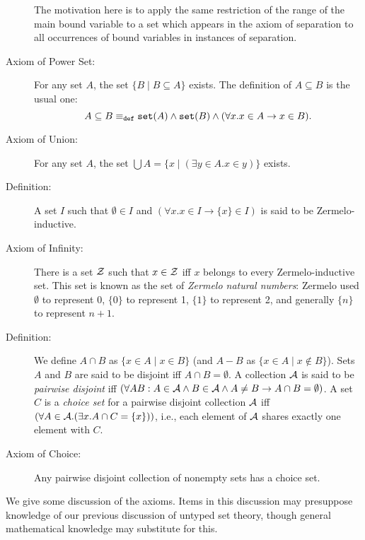 \documentclass[12pt]{book}
\begin{document}
\begin{description}
\begin{description}
\end{description}

The motivation here is to apply the same restriction of the range of the main bound variable to a set which appears in the axiom of separation to all occurrences of bound variables in instances of separation. 

\item[Axiom of Power Set:] For any set $A$, the set $\{B \mid B \subseteq A\}$
exists.  The definition of $A \subseteq B$ is the usual one:  $$A \subseteq B \equiv_{\tt def} {\tt set}(A) \wedge {\tt set}(B) \wedge (\forall x.x \in A \rightarrow x \in B).$$ 

\item[Axiom of Union:] For any set $A$, the set $\bigcup A = \{x \mid (\exists
y \in A.x \in y)\}$ exists.

\item[Definition:]  A set $I$ such that $\emptyset \in I$
and $(\forall x.x \in I \rightarrow \{x\} \in I)$ is said to be Zermelo-inductive.

\item[Axiom of Infinity:]  There is a set $\cal Z$ such that $x \in \cal Z$ iff $x$ belongs to every Zermelo-inductive set.   This set is known as the set of {\em Zermelo natural numbers\/}:  Zermelo used $\emptyset$ to represent 0, $\{0\}$ to represent 1, $\{1\}$ to represent 2, and generally $\{n\}$ to represent $n+1$.

\item[Definition:]  We define $A \cap B$ as $\{x \in A \mid x \in B\}$ (and $A-B$ as \newline $\{x \in A\mid x \not\in B\}$).  Sets $A$ and $B$ are said to be disjoint iff  $A \cap B = \emptyset$.  A collection ${\cal A}$ is said to be {\em pairwise disjoint\/} iff $(\forall AB:  A \in {\cal A} \wedge B \in {\cal A} \wedge A \neq B \rightarrow A \cap B = \emptyset)$.  A set $C$ is a {\em choice set\/} for a pairwise disjoint collection $\cal A$ iff $(\forall A \in {\cal A}.(\exists x.A \cap C = \{x\}))$, i.e., each element of $\cal A$ shares exactly one element with $C$.

\item[Axiom of Choice:] Any pairwise disjoint collection of nonempty sets has a
choice set.

\end{description}

We give some discussion of the axioms.  Items in this discussion may presuppose knowledge of our previous discussion of untyped set theory, though general mathematical knowledge may substitute for this.
\end{document}
